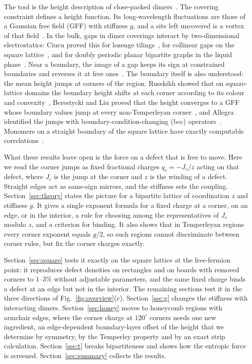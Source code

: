 \documentclass[aps,pre,twocolumn,superscriptaddress,nofootinbib,floatfix]{revtex4-2}
\begin{document}
The tool is the height description of close-packed dimers~\cite{Thurston1990,Nienhuis1984,Kenyon2000,Kenyon2001,Henley2010}. The covering constraint defines a height function. Its long-wavelength fluctuations are those of a Gaussian free field (GFF) with stiffness $g$, and a site left uncovered is a vortex of that field~\cite{Alet2005,Alet2006}. In the bulk, gaps in dimer coverings interact by two-dimensional electrostatics: Ciucu proved this for lozenge tilings~\cite{Ciucu2005,Ciucu2008,Ciucu2010}, for collinear gaps on the square lattice~\cite{Ciucu2014}, and for doubly periodic planar bipartite graphs in the liquid phase~\cite{Ciucu2017}. Near a boundary, the image of a gap keeps its sign at constrained boundaries and reverses it at free ones~\cite{CiucuKrattenthaler2011,Ciucu2015,CiucuFischer}. The boundary itself is also understood: the mean height jumps at corners of the region. Russkikh showed that on square-lattice domains the boundary height shifts at each corner according to its colour and convexity~\cite{Russkikh2018}, Berestycki and Liu proved that the height converges to a GFF whose boundary values jump at every non-Temperleyan corner~\cite{BerestyckiLiu2023}, and Allegra identified the jumps with boundary-condition-changing (bcc) operators~\cite{Allegra2015}. Monomers on a straight boundary of the square lattice have exactly computable correlations~\cite{PriezzhevRuelle2008}.

What these results leave open is the force on a defect that is free to move. Here we read the corner jumps as fixed fractional charges $q_c=-J_c/z$ acting on that defect, where $J_c$ is the jump at the corner and $z$ is the winding of a defect. Straight edges act as same-sign mirrors, and the stiffness sets the coupling. Section~\ref{sec:theory} states the picture for a bipartite lattice of coordination $z$ and stiffness $g$. It gives a single exponent formula for a fixed charge at a corner, on an edge, or in the interior, a rule for choosing among the representatives of $J_c$ modulo $z$, and a criterion for binding. It also shows that in Temperleyan regions every corner exponent equals $g/2$, so such regions cannot discriminate between corner rules, but fix the corner charges exactly.

Section~\ref{sec:square} tests it exactly on the square lattice at the free-fermion point: it reproduces defect densities on rectangles and on boards with removed corners to $1$--$3\%$ without adjustable parameters, and the same fixed charge binds a defect at an edge but not in the interior. The remaining sections test it in the three directions of Fig.~\ref{fig:overview}(c). Section~\ref{sec:g} changes the stiffness with interacting dimers. Section~\ref{sec:honey} moves to honeycomb regions with armchair edges, where the corner charge at $120^\circ$ corners needs one new ingredient, an edge-dependent boundary-layer offset of the height that we determine by symmetry, by the Temperley property and by an exact strip calculation. Section~\ref{sec:t} breaks bipartiteness and shows how the entropic force is screened. Section~\ref{sec:summary} collects the results.
\end{document}
